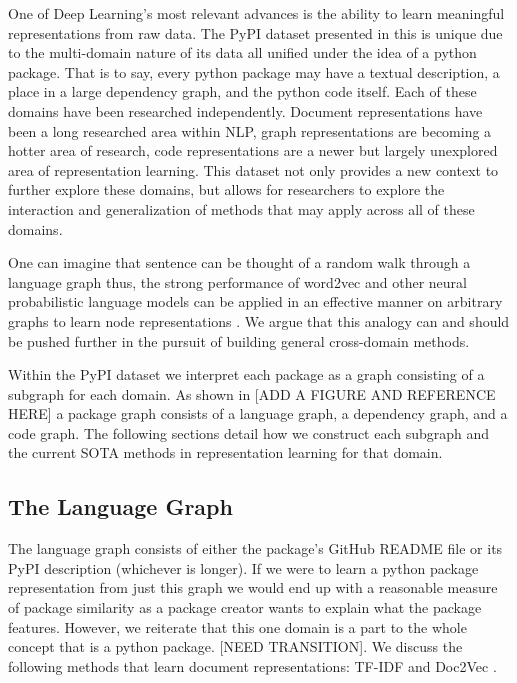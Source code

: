 \documentclass{article}
\begin{document}
One of Deep Learning's most relevant advances is the ability to learn meaningful representations from raw data. The PyPI dataset presented in this is unique due to the multi-domain nature of its data all unified under the idea of a python package. That is to say, every python package may have a textual description, a place in a large dependency graph, and the python code itself. Each of these domains have been researched independently. Document representations have been a long researched area within NLP, graph representations are becoming a hotter area of research, code representations are a newer but largely unexplored area of representation learning. This dataset not only provides a new context to further explore these domains, but allows for researchers to explore the interaction and generalization of methods that may apply across all of these domains. 

One can imagine that sentence can be thought of a random walk through a language graph thus, the strong performance of word2vec \cite{word2vec} and other neural probabilistic language models \cite{bengio2003neural} can be applied in an effective manner on arbitrary graphs to learn node representations \cite{deepwalk}. We argue that this analogy can and should be pushed further in the pursuit of building general cross-domain methods. 

Within the PyPI dataset we interpret each package as a graph consisting of a subgraph for each domain. As shown in [ADD A FIGURE AND REFERENCE HERE] a package graph consists of a language graph, a dependency graph, and a code graph. The following sections detail how we construct each subgraph and the current SOTA methods in representation learning for that domain.

\subsection{The Language Graph}

The language graph consists of either the package's GitHub README file or its PyPI description (whichever is longer). If we were to learn a python package representation from just this graph we would end up with a reasonable measure of package similarity as a package creator wants to explain what the package features. However, we reiterate that this one domain is a part to the whole concept that is a python package. [NEED TRANSITION]. We discuss the following methods that learn document representations: TF-IDF and Doc2Vec \cite{doc2vec}.
\end{document}

